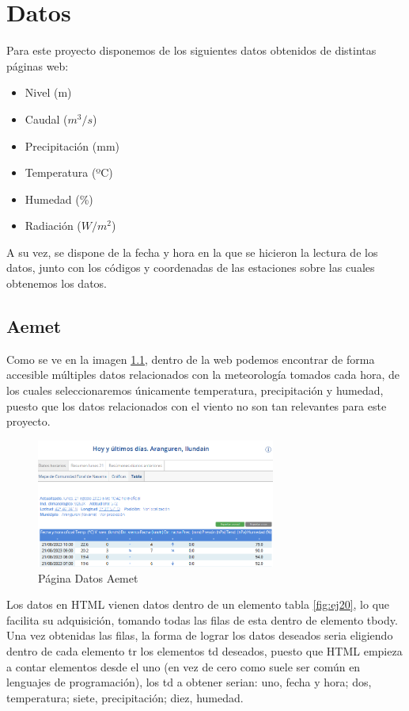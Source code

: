 \chapter[Datos]{Datos}
\label{Chap2}

Para este proyecto disponemos de los siguientes datos obtenidos de distintas páginas web:
\begin{itemize}
	\item Nivel (m)
	\item Caudal ($m^3/s$)
	\item Precipitación (mm)
	\item Temperatura (ºC)
	\item Humedad (\%)
	\item Radiación ($W/m^2$)
\end{itemize}
A su vez, se dispone de la fecha y hora en la que se hicieron la lectura de los datos, junto con los códigos y coordenadas de las estaciones sobre las cuales obtenemos los datos.

\section{Aemet}
Como se ve en la imagen \ref{fig:ej3}, dentro de la web podemos encontrar de forma accesible múltiples datos relacionados con la meteorología tomados cada hora, de los cuales seleccionaremos únicamente temperatura, precipitación y humedad, puesto que los datos relacionados con el viento no son tan relevantes para este proyecto.

\begin{figure} [H]
	\centering
	\includegraphics[width=0.7\textwidth]{fig/AemetData.png}
	\caption[Página Aemet de la estación en Aranguren (Navarra)]{Página Datos Aemet}
	\label{fig:ej3}
\end{figure}

Los datos en HTML vienen datos dentro de un elemento tabla \ref{fig:ej20}, lo que facilita su adquisición, tomando todas las filas de esta dentro de elemento tbody. Una vez obtenidas las filas, la forma de lograr los datos deseados seria eligiendo dentro de cada elemento tr los elementos td deseados, puesto que HTML empieza a contar elementos desde el uno (en vez de cero como suele ser común en lenguajes de programación), los td a obtener serian: uno, fecha y hora; dos, temperatura; siete, precipitación; diez, humedad.

